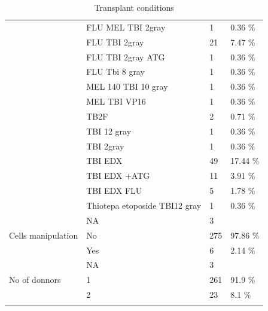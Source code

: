 \documentclass[a4paper,11pt] {article}
\begin{document}
\begin{longtable}{llll}
   & FLU MEL TBI 2gray & 1 & 0.36 \% \\ 
   & FLU TBI 2gray & 21 & 7.47 \% \\ 
   & FLU TBI 2gray ATG & 1 & 0.36 \% \\ 
   & FLU Tbi 8 gray & 1 & 0.36 \% \\ 
   & MEL 140 TBI 10 gray & 1 & 0.36 \% \\ 
   & MEL TBI VP16 & 1 & 0.36 \% \\ 
   & TB2F & 2 & 0.71 \% \\ 
   & TBI 12 gray & 1 & 0.36 \% \\ 
   & TBI 2gray & 1 & 0.36 \% \\ 
   & TBI EDX & 49 & 17.44 \% \\ 
   & TBI EDX +ATG & 11 & 3.91 \% \\ 
   & TBI EDX FLU & 5 & 1.78 \% \\ 
   & Thiotepa etoposide TBI12 gray & 1 & 0.36 \% \\ 
   & NA & 3 &  \\ 
  Cells manipulation & No & 275 & 97.86 \% \\ 
   & Yes & 6 & 2.14 \% \\ 
   & NA & 3 &  \\ 
  No of donnors & 1 & 261 & 91.9 \% \\ 
   & 2 & 23 & 8.1 \% \\ 
   \hline
\hline
\caption{Transplant conditions} 
\label{tab:g}
\end{longtable}
\pagebreak
\end{document}
